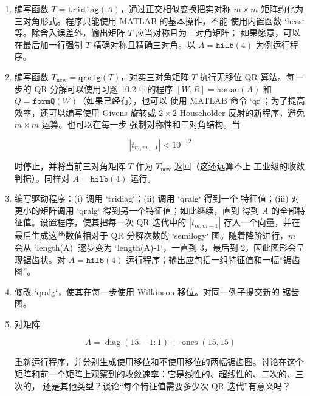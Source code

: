 \documentclass[UTF8,fontset=none,12pt]{ctexart}
\begin{document}
\begin{enumerate}[label=(\alph*)]
  \item 编写函数 $T=\texttt{tridiag}(A)$，通过正交相似变换把实对称
  $m\times m$ 矩阵约化为三对角形式。程序只能使用 MATLAB 的基本操作，不能
  使用内置函数 `hess` 等。除舍入误差外，输出矩阵 $T$ 应当对称且为三对角矩阵；
  如果愿意，可以在最后加一行强制 $T$ 精确对称且精确三对角。以
  $A=\texttt{hilb}(4)$ 为例运行程序。

  \item 编写函数 $T_{\mathrm{new}}=\texttt{qralg}(T)$，对实三对角矩阵
  $T$ 执行无移位 QR 算法。每一步的 QR 分解可以使用习题 10.2 中的程序
  $[W,R]=\texttt{house}(A)$ 和 $Q=\texttt{formQ}(W)$（如果已经有），也可以
  使用 MATLAB 命令 `qr`；为了提高效率，还可以编写使用 Givens 旋转或
  $2\times2$ Householder 反射的新程序，避免 $m\times m$ 运算。也可以在每一步
  强制对称性和三对角结构。当
  
  $$
  |t_{m,m-1}|<10^{-12}
  $$
  
  时停止，并将当前三对角矩阵 $T$ 作为 $T_{\mathrm{new}}$ 返回（这还远算不上
  工业级的收敛判据）。同样对 $A=\texttt{hilb}(4)$ 运行。

  \item 编写驱动程序：(i) 调用 `tridiag`；(ii) 调用 `qralg` 得到一个
  特征值；(iii) 对更小的矩阵调用 `qralg` 得到另一个特征值；如此继续，直到
  得到 $A$ 的全部特征值。设置程序，使其把每一次 QR 迭代中的
  $|t_{m,m-1}|$ 存入一个向量，并在最后生成这些数值相对于 QR 分解次数的
  `semilogy` 图。随着降阶进行，$m$ 会从 `length(A)` 逐步变为
  `length(A)-1`，一直到 3，最后到 2，因此图形会呈现锯齿状。对
  $A=\texttt{hilb}(4)$ 运行程序；输出应包括一组特征值和一幅“锯齿图”。

  \item 修改 `qralg`，使其在每一步使用 Wilkinson 移位。对同一例子提交新的
  锯齿图。

  \item 对矩阵
  
  $$
  A=\operatorname{diag}(15:-1:1)+\operatorname{ones}(15,15)
  $$
  
  重新运行程序，并分别生成使用移位和不使用移位的两幅锯齿图。讨论在这个
  矩阵和前一个矩阵上观察到的收敛速率：它是线性的、超线性的、二次的、三次的，
  还是其他类型？谈论“每个特征值需要多少次 QR 迭代”有意义吗？
\end{enumerate}
\end{document}

